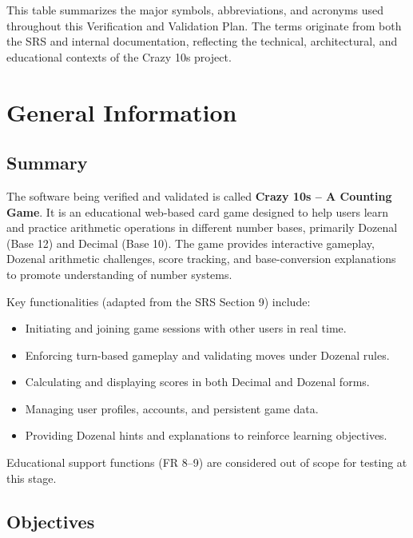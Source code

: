 \documentclass[12pt, titlepage]{article}
\begin{document}
\noindent
This table summarizes the major symbols, abbreviations, and acronyms used throughout this Verification and Validation Plan. The terms originate from both the SRS and internal documentation, reflecting the technical, architectural, and educational contexts of the Crazy 10s project.

\newpage

\section{General Information}

\subsection{Summary}
The software being verified and validated is called \textbf{Crazy 10s – A Counting Game}. It is an educational web-based card game designed to help users learn and practice arithmetic operations in different number bases, primarily Dozenal (Base 12) and Decimal (Base 10). The game provides interactive gameplay, Dozenal arithmetic challenges, score tracking, and base-conversion explanations to promote understanding of number systems.  

Key functionalities (adapted from the SRS Section 9) include:
\begin{itemize}
    \item Initiating and joining game sessions with other users in real time.
    \item Enforcing turn-based gameplay and validating moves under Dozenal rules.
    \item Calculating and displaying scores in both Decimal and Dozenal forms.
    \item Managing user profiles, accounts, and persistent game data.
    \item Providing Dozenal hints and explanations to reinforce learning objectives.
\end{itemize}
Educational support functions (FR 8–9) are considered out of scope for testing at this stage.

\subsection{Objectives}
\end{document}
